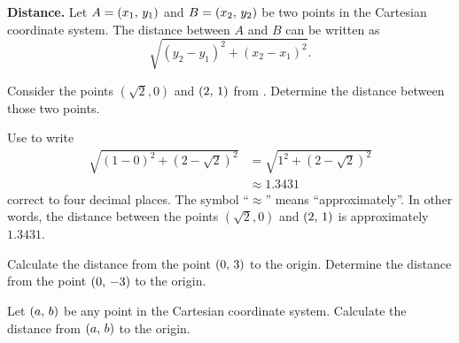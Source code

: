 \documentclass[a4paper,oneside,12pt]{article}
\begin{document}
\begin{theorem}
\label{thm:distance_between_two_points}
\textbf{Distance.}
Let $A = \left\lparen{x_1},\, {y_1}\right\rparen$ and $B = \left\lparen{x_2},\, {y_2}\right\rparen$ be two points in
the Cartesian coordinate system.  The distance between $A$ and $B$ can
be written as
\[
\sqrt{
  (y_2 - y_1)^2
  +
  (x_2 - x_1)^2
}.
\]
\end{theorem}

\begin{example}
Consider the points $(\sqrt{2}\comma 0)$ and $\left\lparen{2},\, {1}\right\rparen$ from
.  Determine the distance
between those two points.
\end{example}

\begin{solution}
Use  to write
\begin{align*}
\sqrt{
  (1 - 0)^2
  +
  (2 - \sqrt{2})^2
}
&=
\sqrt{
  1^2 + (2 - \sqrt{2})^2
} \\[4pt]
&\approx
1.3431
\end{align*}
correct to four decimal places.  The symbol ``$\approx$'' means
``approximately''.  In other words, the distance between the points
$(\sqrt{2}\comma 0)$ and $\left\lparen{2},\, {1}\right\rparen$ is approximately $1.3431$.
\end{solution}

\begin{exercise}
Calculate the distance from the point $\left\lparen{0},\, {3}\right\rparen$ to the origin.
Determine the distance from the point $\left\lparen{0},\, {-3}\right\rparen$ to the origin.
\end{exercise}


\begin{exercise}
Let $\left\lparen{a},\, {b}\right\rparen$ be any point in the Cartesian coordinate system.
Calculate the distance from $\left\lparen{a},\, {b}\right\rparen$ to the origin.
\end{exercise}
\end{document}
